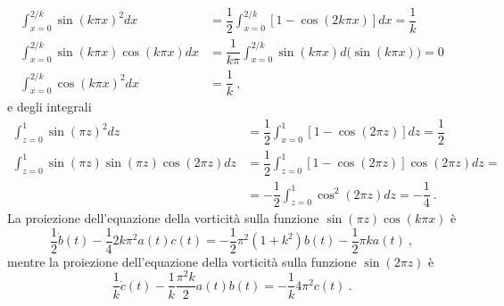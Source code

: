 \begin{equation}
\begin{aligned}
 \int_{x=0}^{2/k} \sin{(k \pi x)}^2 dx & = \dfrac{1}{2} \int_{x=0}^{2/k} \left[ 1 - \cos{(2 k \pi x)} \right] dx = \dfrac{1}{k} \\
 \int_{x=0}^{2/k} \sin{(k \pi x)}\cos{(k \pi x)} dx & = \dfrac{1}{k \pi} \int_{x=0}^{2/k} \sin{(k \pi x)} d \big( \sin{(k \pi x)} \big) = 0 \\
 \int_{x=0}^{2/k} \cos{(k \pi x)}^2 dx & = \dfrac{1}{k} \ ,
\end{aligned}
\end{equation}
e degli integrali
\begin{equation}
\begin{aligned}
 \int_{z=0}^{1} \sin{(\pi z)}^2 dz & = \dfrac{1}{2} \int_{x=0}^{1} \left[ 1 - \cos{(2\pi z)} \right] dz = \dfrac{1}{2} \\
 \int_{z=0}^{1} \sin{(\pi z)} \sin{(\pi z)} \cos{(2\pi z)} dz  & =
 \dfrac{1}{2} \int_{z=0}^{1} \left[ 1 - \cos{(2\pi z)} \right]  \cos{(2\pi z)} dz = \\
 & = - \dfrac{1}{2} \int_{z=0}^{1} \cos^2{(2\pi z)}  dz = 
  - \dfrac{1}{4} \ .
\end{aligned}
\end{equation}
%
La proiezione dell'equazione della vorticità sulla funzione $\sin{(\pi z)} \cos{(k \pi x)}$ è
\begin{equation}
    \dfrac{1}{2}\dot{b}(t) - \dfrac{1}{4} 2 k \pi^2 a(t) c(t) =
    -\dfrac{1}{2} \pi^2 (1+k^2) b(t) - \dfrac{1}{2}\pi k a(t) \ ,
\end{equation}
mentre la proiezione dell'equazione della vorticità sulla funzione $\sin{(2 \pi z)}$ è
\begin{equation}
    \dfrac{1}{k}\dot{c}(t) - \dfrac{1}{k} \dfrac{\pi^2 k}{2} a(t) b(t) =
    - \dfrac{1}{k} 4 \pi^2 c(t) \ .
\end{equation}
%
%
